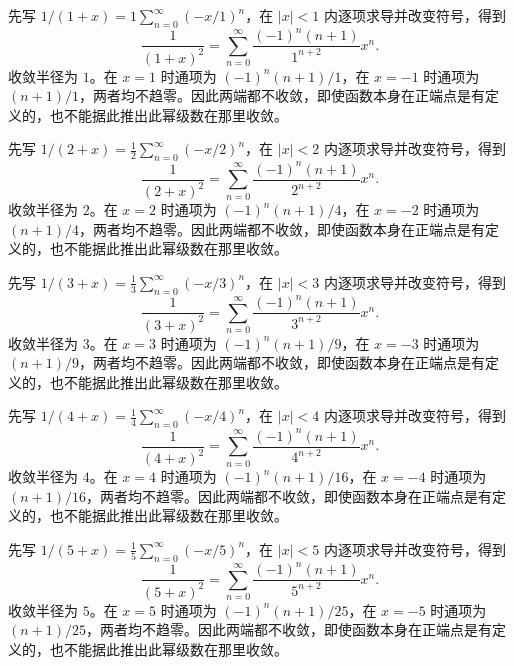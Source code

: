 \documentclass[12pt,fontset=fandol]{ctexart}
\begin{document}
\begin{solve}\label{ans:c27q19}
先写 $1/(1+x)=1\sum_{n=0}^\infty(-x/1)^n$，在 $|x|<1$ 内逐项求导并改变符号，得到
\[
\frac1{(1+x)^2}=\sum_{n=0}^\infty\frac{(-1)^n(n+1)}{1^{n+2}}x^n.
\]
收敛半径为 $1$。在 $x=1$ 时通项为 $(-1)^n(n+1)/1$，在 $x=-1$ 时通项为 $(n+1)/1$，两者均不趋零。因此两端都不收敛，即使函数本身在正端点是有定义的，也不能据此推出此幂级数在那里收敛。
\end{solve}

\begin{solve}\label{ans:c27q20}
先写 $1/(2+x)=\frac{1}{2}\sum_{n=0}^\infty(-x/2)^n$，在 $|x|<2$ 内逐项求导并改变符号，得到
\[
\frac1{(2+x)^2}=\sum_{n=0}^\infty\frac{(-1)^n(n+1)}{2^{n+2}}x^n.
\]
收敛半径为 $2$。在 $x=2$ 时通项为 $(-1)^n(n+1)/4$，在 $x=-2$ 时通项为 $(n+1)/4$，两者均不趋零。因此两端都不收敛，即使函数本身在正端点是有定义的，也不能据此推出此幂级数在那里收敛。
\end{solve}

\begin{solve}\label{ans:c27q21}
先写 $1/(3+x)=\frac{1}{3}\sum_{n=0}^\infty(-x/3)^n$，在 $|x|<3$ 内逐项求导并改变符号，得到
\[
\frac1{(3+x)^2}=\sum_{n=0}^\infty\frac{(-1)^n(n+1)}{3^{n+2}}x^n.
\]
收敛半径为 $3$。在 $x=3$ 时通项为 $(-1)^n(n+1)/9$，在 $x=-3$ 时通项为 $(n+1)/9$，两者均不趋零。因此两端都不收敛，即使函数本身在正端点是有定义的，也不能据此推出此幂级数在那里收敛。
\end{solve}

\begin{solve}\label{ans:c27q22}
先写 $1/(4+x)=\frac{1}{4}\sum_{n=0}^\infty(-x/4)^n$，在 $|x|<4$ 内逐项求导并改变符号，得到
\[
\frac1{(4+x)^2}=\sum_{n=0}^\infty\frac{(-1)^n(n+1)}{4^{n+2}}x^n.
\]
收敛半径为 $4$。在 $x=4$ 时通项为 $(-1)^n(n+1)/16$，在 $x=-4$ 时通项为 $(n+1)/16$，两者均不趋零。因此两端都不收敛，即使函数本身在正端点是有定义的，也不能据此推出此幂级数在那里收敛。
\end{solve}

\begin{solve}\label{ans:c27q23}
先写 $1/(5+x)=\frac{1}{5}\sum_{n=0}^\infty(-x/5)^n$，在 $|x|<5$ 内逐项求导并改变符号，得到
\[
\frac1{(5+x)^2}=\sum_{n=0}^\infty\frac{(-1)^n(n+1)}{5^{n+2}}x^n.
\]
收敛半径为 $5$。在 $x=5$ 时通项为 $(-1)^n(n+1)/25$，在 $x=-5$ 时通项为 $(n+1)/25$，两者均不趋零。因此两端都不收敛，即使函数本身在正端点是有定义的，也不能据此推出此幂级数在那里收敛。
\end{solve}
\end{document}
